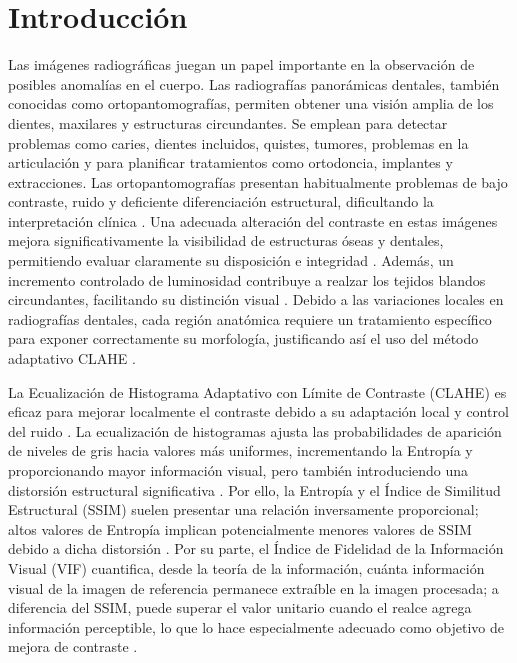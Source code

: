 \documentclass[sigplan,screen]{acmart}
\begin{document}
\section{Introducción}

Las imágenes radiográficas juegan un papel importante en la observación de posibles anomalías en el cuerpo. Las radiografías panorámicas dentales, también conocidas como ortopantomografías, permiten obtener una visión amplia de los dientes, maxilares y estructuras circundantes. Se emplean para detectar problemas como caries, dientes incluidos, quistes, tumores, problemas en la articulación y para planificar tratamientos como ortodoncia, implantes y extracciones. Las ortopantomografías  presentan habitualmente problemas de bajo contraste, ruido y deficiente diferenciación estructural, dificultando la interpretación clínica \cite{Wang2005}. Una adecuada alteración del contraste en estas imágenes mejora significativamente la visibilidad de estructuras óseas y dentales, permitiendo evaluar claramente su disposición e integridad \cite{More2015}. Además, un incremento controlado de luminosidad contribuye a realzar los tejidos blandos circundantes, facilitando su distinción visual \cite{Pizer1987}. Debido a las variaciones locales en radiografías dentales, cada región anatómica requiere un tratamiento específico para exponer correctamente su morfología, justificando así el uso del método adaptativo CLAHE \cite{Zuiderveld1994}.\par
La Ecualización de Histograma Adaptativo con Límite de Contraste (CLAHE) es eficaz para mejorar localmente el contraste debido a su adaptación local y control del ruido \cite{Pizer1987}. La ecualización de histogramas ajusta las probabilidades de aparición de niveles de gris hacia valores más uniformes, incrementando la Entropía y proporcionando mayor información visual, pero también introduciendo una distorsión estructural significativa \cite{Tsai2008}. Por ello, la Entropía y el Índice de Similitud Estructural (SSIM) suelen presentar una relación inversamente proporcional; altos valores de Entropía implican potencialmente menores valores de SSIM debido a dicha distorsión \cite{Wang2004}. Por su parte, el Índice de Fidelidad de la Información Visual (VIF) cuantifica, desde la teoría de la información, cuánta información visual de la imagen de referencia permanece extraíble en la imagen procesada; a diferencia del SSIM, puede superar el valor unitario cuando el realce agrega información perceptible, lo que lo hace especialmente adecuado como objetivo de mejora de contraste \cite{Sheikh2006}.\par
\end{document}
